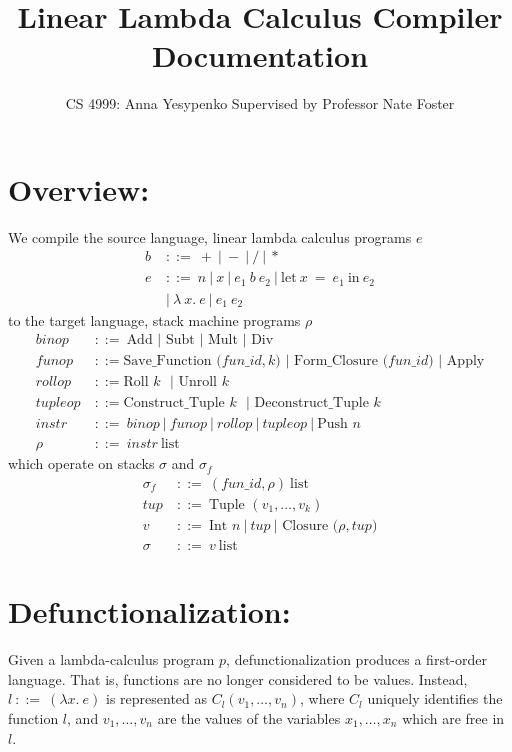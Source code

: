 \documentclass[11pt]{article}
\begin{document}
\title{Linear Lambda Calculus Compiler Documentation}
\author{CS 4999: Anna Yesypenko Supervised by Professor Nate Foster}
\maketitle

\section*{Overview:}

We compile the source language, linear lambda calculus programs $e$
\begin{align*}
    b\ &::=\ +\ |\ -\ |\ /\ |\ *\\
    e\ &::=\ n\ |\ x\ |\ e_1\ b\ e_2\ |\ \text{let}\ x\ =\ e_1\ \text{in}\ e_2\\
    &|\ \lambda\ x.\ e\ |\ e_1\ e_2
\end{align*}
to the target language, stack machine programs $\rho$
\begin{align*}
    binop\ &::=\ \text{Add $|$ Subt $|$ Mult $|$ Div}\\
    funop\ &::= \text{Save\_Function ($fun\_id, k$) $|$ Form\_Closure ($fun\_id$) $|$ Apply}\\
    rollop\ &::= \text{Roll $k$ $|$ Unroll $k$}\\
    tupleop\ &::= \text{Construct\_Tuple $k$ $|$ Deconstruct\_Tuple $k$}\\
    instr\ &::=\ binop\ |\ funop\ |\ rollop\ |\ tupleop\ |\ \text{Push $n$}\\
    \rho &::=\ instr\ \text{list}
\end{align*}
which operate on stacks $\sigma$ and $\sigma_f$
\begin{align*}
    \sigma_f\ &::=\ (fun\_id, \rho)\ \text{list}\\
    tup\ &::=\ \text{Tuple $(v_1, \dots, v_k)$}\\
    v\ &::=\ \text {Int $n\ |\ tup\ |$ Closure ($\rho, tup$)}\\
    \sigma &::=\ v\ \text{list}
\end{align*}

\break{}

\section*{Defunctionalization:}

Given a lambda-calculus program $p$, defunctionalization produces a first-order language. That is, functions are no longer considered to be values. Instead, $l\ ::=\ (\lambda x.\ e)$ is represented as $C_l(v_1, \dots, v_n)$, where $C_l$ uniquely identifies the function $l$, and $v_1, \dots, v_n$ are the values of the variables $x_1, \dots, x_n$ which are free in $l$.
\end{document}
